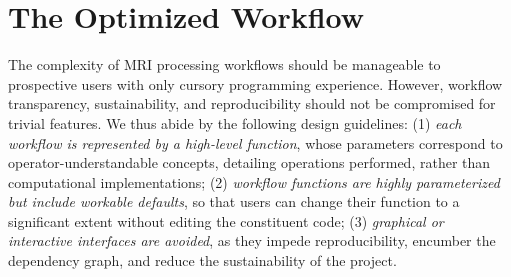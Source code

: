 \section{The Optimized Workflow}
The complexity of MRI processing workflows should be manageable to prospective users with only cursory programming experience.
However, workflow transparency, sustainability, and reproducibility should not be compromised for trivial features.
We thus abide by the following design guidelines:
(1) \textit{each workflow is represented by a high-level function}, whose parameters correspond to operator-understandable concepts, detailing operations performed, rather than computational implementations;
(2) \textit{workflow functions are highly parameterized but include workable defaults}, so that users can change their function to a significant extent without editing the constituent code;
(3) \textit{graphical or interactive interfaces are avoided}, as they impede reproducibility, encumber the dependency graph, and reduce the sustainability of the project.

